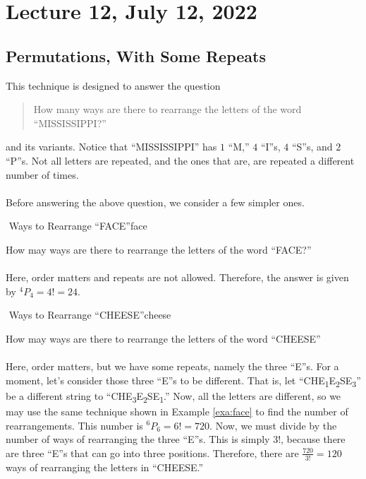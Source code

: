     \pagebreak
    
\section{Lecture 12, July 12, 2022}
    
    \subsection{Permutations, With Some Repeats}
    
        This technique is designed to answer the question
        \begin{quote}
           How many ways are there to rearrange the letters of the word ``MISSISSIPPI?''
        \end{quote}
        and its variants. Notice that ``MISSISSIPPI'' has \(1\) ``M,'' \(4\) ``I''s, \(4\) ``S''s, and \(2\) ``P''s. Not all letters are repeated, and the ones that are, are repeated a different number of times.
        \\
        \\
        Before answering the above question, we consider a few simpler ones. 
        \begin{example}{\Difficulty\,\,Ways to Rearrange ``FACE''}{face}
        
            How may ways are there to rearrange the letters of the word ``FACE?''
            \\
            \\
            Here, order matters and repeats are not allowed. Therefore, the answer is given by \(^4P_4=4!=24\).
            
        \end{example}
        \begin{example}{\Difficulty\,\,Ways to Rearrange ``CHEESE''}{cheese}
        
            How may ways are there to rearrange the letters of the word ``CHEESE''
            \\
            \\
            Here, order matters, but we have some repeats, namely the three ``E''s. For a moment, let's consider those three ``E''s to be different. That is, let ``CHE\textsubscript{1}E\textsubscript{2}SE\textsubscript{3}'' be a different string to ``CHE\textsubscript{3}E\textsubscript{2}SE\textsubscript{1}.'' Now, all the letters are different, so we may use the same technique shown in Example \ref{exa:face} to find the number of rearrangements. This number is \(^6P_6=6!=720\). Now, we must divide by the number of ways of rearranging the three ``E''s. This is simply \(3!\), because there are three ``E''s that can go into three positions. Therefore, there are \(\frac{720}{3!}=120\) ways of rearranging the letters in ``CHEESE.''
            
        \end{example}
